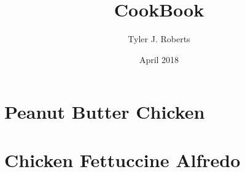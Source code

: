 \documentclass[a4paper,12pt]{article}
\begin{document}
\author{Tyler J. Roberts}
\title{CookBook}
\date{April 2018}

\maketitle
\newpage
\tableofcontents

\newpage
\section{Peanut Butter Chicken}

\newpage

\section{Chicken Fettuccine Alfredo}

\newpage
\end{document}
